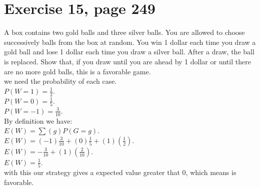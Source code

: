 \documentclass[]{article}
\begin{document}
\section{Exercise 15, page 249}
A box contains two gold balls and three silver balls. You are allowed to choose successively balls from the box at random. You win 1 dollar each time you draw a gold ball and lose 1 dollar each time you draw a silver ball. After a draw, the ball is replaced. Show that, if you draw until you are ahead by 1 dollar or until there are no more gold balls, this is a favorable game.\\
we need the probability of each case.\\
$P(W = 1)  = \frac{1}{2}$.  \\
$P(W = 0)  = \frac{1}{5}$.  \\
$P(W = -1) = \frac{3}{10}$. \\
By definition we have:\\
$E(W) = \sum (g)P(G = g)$. \\
$E(W) = (-1)\frac{3}{10} + (0)\frac{1}{5} + (1)(\frac{1}{2})$. \\
$E(W) = -\frac{3}{10} + (1)(\frac{2}{10})$. \\
$E(W) = \frac{1}{5}$. \\
with this our strategy gives a expected value greater that 0, which means is favorable.
\end{document}
